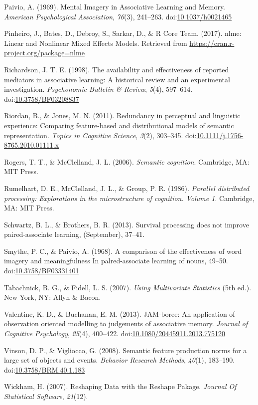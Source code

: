 \documentclass[english,man]{apa6}
\theoremstyle{definition}
\theoremstyle{definition}
\theoremstyle{remark}
\begin{document}
\hypertarget{ref-Paivio1969}{}
Paivio, A. (1969). Mental Imagery in Associative Learning and Memory.
\emph{American Psychological Association}, \emph{76}(3), 241--263.
doi:\href{https://doi.org/10.1037/h0021465}{10.1037/h0021465}

\hypertarget{ref-Pinheiro2017}{}
Pinheiro, J., Bates, D., Debroy, S., Sarkar, D., \& R Core Team. (2017).
nlme: Linear and Nonlinear Mixed Effects Models. Retrieved from
\url{https://cran.r-project.org/package=nlme}

\hypertarget{ref-Richardson1998}{}
Richardson, J. T. E. (1998). The availability and effectiveness of
reported mediators in associative learning: A historical review and an
experimental investigation. \emph{Psychonomic Bulletin \& Review},
\emph{5}(4), 597--614.
doi:\href{https://doi.org/10.3758/BF03208837}{10.3758/BF03208837}

\hypertarget{ref-Riordan2011}{}
Riordan, B., \& Jones, M. N. (2011). Redundancy in perceptual and
linguistic experience: Comparing feature-based and distributional models
of semantic representation. \emph{Topics in Cognitive Science},
\emph{3}(2), 303--345.
doi:\href{https://doi.org/10.1111/j.1756-8765.2010.01111.x}{10.1111/j.1756-8765.2010.01111.x}

\hypertarget{ref-Rogers2006}{}
Rogers, T. T., \& McClelland, J. L. (2006). \emph{Semantic cognition}.
Cambridge, MA: MIT Press.

\hypertarget{ref-Rumelhart1986}{}
Rumelhart, D. E., McClelland, J. L., \& Group, P. R. (1986).
\emph{Parallel distributed processing: Explorations in the
microstructure of cognition. Volume 1}. Cambridge, MA: MIT Press.

\hypertarget{ref-Schwartz2013}{}
Schwartz, B. L., \& Brothers, B. R. (2013). Survival processing does not
improve paired-associate learning, (September), 37--41.

\hypertarget{ref-Smythe1968}{}
Smythe, P. C., \& Paivio, A. (1968). A comparison of the effectiveness
of word imagery and meaningfulness In palred-associate learning of
nouns, 49--50.
doi:\href{https://doi.org/10.3758/BF03331401}{10.3758/BF03331401}

\hypertarget{ref-Tabachnick2007}{}
Tabachnick, B. G., \& Fidell, L. S. (2007). \emph{Using Multivariate
Statistics} (5th ed.). New York, NY: Allyn \& Bacon.

\hypertarget{ref-Valentine2013}{}
Valentine, K. D., \& Buchanan, E. M. (2013). JAM-boree: An application
of observation oriented modelling to judgements of associative memory.
\emph{Journal of Cognitive Psychology}, \emph{25}(4), 400--422.
doi:\href{https://doi.org/10.1080/20445911.2013.775120}{10.1080/20445911.2013.775120}

\hypertarget{ref-Vinson2008}{}
Vinson, D. P., \& Vigliocco, G. (2008). Semantic feature production
norms for a large set of objects and events. \emph{Behavior Research
Methods}, \emph{40}(1), 183--190.
doi:\href{https://doi.org/10.3758/BRM.40.1.183}{10.3758/BRM.40.1.183}

\hypertarget{ref-Wickham2007}{}
Wickham, H. (2007). Reshaping Data with the Reshape Pakage.
\emph{Journal Of Statistical Software}, \emph{21}(12).
\end{document}
